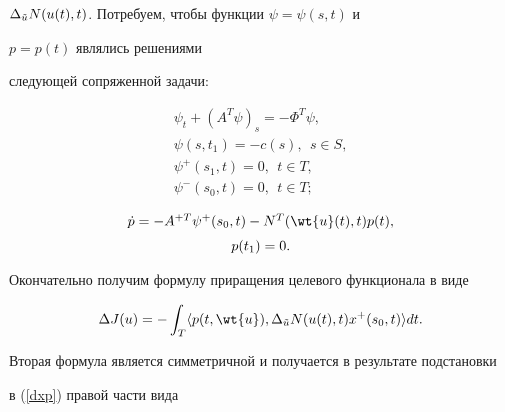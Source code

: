 $\Delta_{\Tilde{u}}N(u(t),t)$. Потребуем, чтобы функции $\psi =\psi (s,t)$ и 


$p=p(t)$ являлись решениями


следующей сопряженной задачи:


\begin{equation}


\begin{array}{c}


\psi_t+(A^T\psi)_s=-\Phi^T\psi,\\[2mm]


\psi(s,t_1)=-c(s),\ \ s\in S,\\[2mm]


\psi^+(s_1,t)=0,\ \ t\in T,\\[2mm]


\psi^-(s_0,t)=0,\ \ t\in T;


\end{array}


\label{psi}


\end{equation}


\begin{equation}


\begin{array}{c}


\Dot{p}=-A^{+T}\psi^+(s_0,t)-N^T(\wt{u}(t),t)p(t),\\[2mm]


p(t_1)=0.


\end{array}


\label{ps}


\end{equation}





Окончательно получим формулу приращения целевого функционала в виде


\begin{equation}


\Delta J(u)=-\int_T \la p(t,\wt{u}),


\Delta_{\Tilde{u}}N(u(t),t)x^+(s_0,t)\ra dt.


\label{dJok}


\end{equation}





Вторая формула является симметричной и получается в результате подстановки


в (\ref{dxp}) правой части вида


